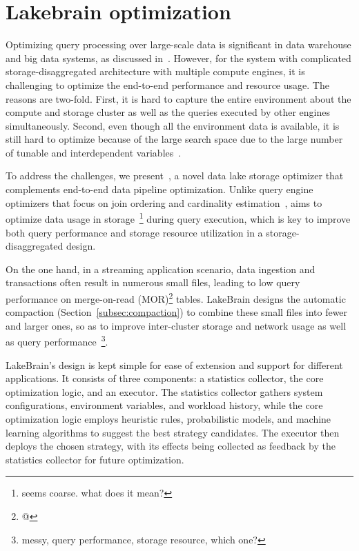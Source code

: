 \section{Lakebrain optimization} 
\label{sec:lakebrain}

Optimizing  query processing over large-scale data is significant in data warehouse and big data systems, as discussed in~\cite{}. However, for the \sys system with
complicated storage-disaggregated architecture with  multiple compute engines, it is challenging to optimize the end-to-end performance and resource usage. The reasons are two-fold. First, it is hard to capture the entire environment about the compute and storage cluster as well as the queries executed by other engines simultaneously. Second, even though all the environment data is available, it is still hard to optimize because of the large search space due to the large number of tunable and interdependent variables~\cite{}.


To address the challenges, we present~\brain, a novel data lake storage optimizer that complements end-to-end data pipeline optimization. Unlike query engine optimizers that focus on join ordering and cardinality estimation~\cite{}, \brain aims to optimize data usage in storage~\footnote{seems coarse. what does it mean?} during query execution, which is key to improve both query performance and storage resource utilization in a storage-disaggregated design.


On the one hand, in a streaming application scenario, data ingestion and transactions often result in numerous small files, leading to low query performance on merge-on-read (MOR)\footnote{@} tables. LakeBrain  designs the automatic compaction (Section~\ref{subsec:compaction}) to combine these small files into fewer and larger ones, so as to  improve inter-cluster storage and network usage as well as query performance~\footnote{messy, query performance, storage resource, which one?}.


LakeBrain's design is kept simple for ease of extension and support for different applications. It consists of three components: a statistics collector, the core optimization logic, and an executor. The statistics collector gathers system configurations, environment variables, and workload history, while the core optimization logic employs heuristic rules, probabilistic models, and machine learning algorithms to suggest the best strategy candidates. The executor then deploys the chosen strategy, with its effects being collected as feedback by the statistics collector for future optimization.

